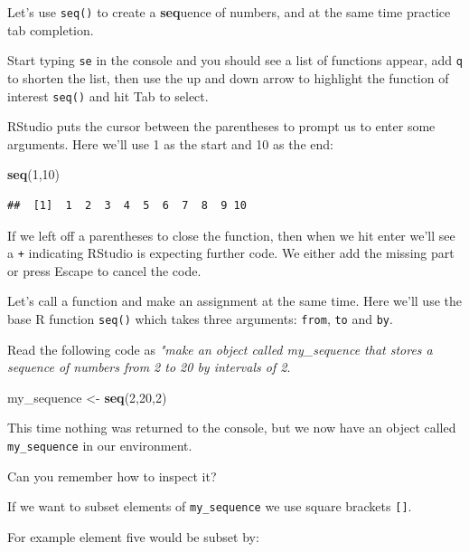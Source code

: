 \documentclass[12pt,]{book}
\newenvironment{Shaded}{\begin{snugshade}}{\end{snugshade}}
\newcommand{\DecValTok}[1]{\textcolor[rgb]{0.00,0.00,0.81}{#1}}
\newcommand{\KeywordTok}[1]{\textcolor[rgb]{0.13,0.29,0.53}{\textbf{#1}}}
\newcommand{\NormalTok}[1]{#1}
\newcommand{\StringTok}[1]{\textcolor[rgb]{0.31,0.60,0.02}{#1}}
\begin{document}
Let's use \texttt{seq()} to create a \textbf{seq}uence of numbers, and at the same time practice tab completion.

Start typing \texttt{se} in the console and you should see a list of functions appear,
add \texttt{q} to shorten the list, then use the up and down arrow to highlight the function
of interest \texttt{seq()} and hit Tab to select.

RStudio puts the cursor between the parentheses to prompt us to enter some
arguments. Here we'll use 1 as the start and 10 as the end:

\begin{Shaded}
\begin{Highlighting}[]
\KeywordTok{seq}\NormalTok{(}\DecValTok{1}\NormalTok{,}\DecValTok{10}\NormalTok{)}
\end{Highlighting}
\end{Shaded}

\begin{verbatim}
##  [1]  1  2  3  4  5  6  7  8  9 10
\end{verbatim}

If we left off a parentheses to close the function, then when we hit enter
we'll see a \texttt{+} indicating RStudio is expecting further code. We either add the
missing part or press Escape to cancel the code.

Let's call a function and make an assignment at the same time. Here we'll use
the base R function \texttt{seq()} which takes three arguments: \texttt{from}, \texttt{to} and \texttt{by}.

Read the following code as \emph{"make an object called my\_sequence that stores a sequence of numbers from 2 to 20 by intervals of 2}.

\begin{Shaded}
\begin{Highlighting}[]
\NormalTok{my_sequence <-}\StringTok{ }\KeywordTok{seq}\NormalTok{(}\DecValTok{2}\NormalTok{,}\DecValTok{20}\NormalTok{,}\DecValTok{2}\NormalTok{)}
\end{Highlighting}
\end{Shaded}

This time nothing was returned to the console, but we now have an object called
\texttt{my\_sequence} in our environment.

Can you remember how to inspect it?

If we want to subset elements of \texttt{my\_sequence} we use
square brackets \texttt{{[}{]}}.

For example element five would be subset by:
\end{document}
